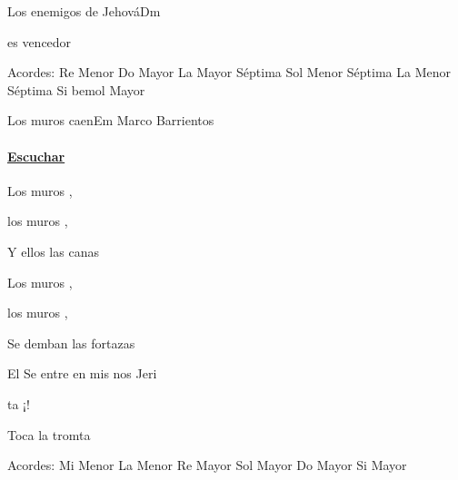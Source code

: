 \documentclass[12pt, spanish]{book}
\begin{document}
\begin{song}{Los enemigos de Jehová}{Dm}
\begin{SBOpGroup}
            es vencedor
        \end{SBOpGroup}

        \ifChordBk
        \begin{SBOpGroup}
            Acordes:\break
            \upchord{\Dm}\qquad Re Menor \hfill
            \upchord{\C}\qquad Do Mayor \hfill\null\break
            \upchord{\Aseven}\qquad La Mayor S\'eptima \hfill
            \upchord{\Gmseven}\qquad Sol Menor S\'eptima \hfill\null\break
            \upchord{\Amseven}\qquad La Menor S\'eptima \hfill
            \upchord{\Bflat}\qquad Si bemol Mayor \hfill\null\break
        \end{SBOpGroup}
        \fi
    \end{song}

    \begin{song}{Los muros caen}{Em}
    {} %
    {Marco Barrientos}
    {} %
    {}
        \ifChordBk
            \paragraph{\mbox{}\hfill\protect\href{https://open.spotify.com/intl-es/track/6Oa2fcRuhb9MMg7aONE8SX}{Escuchar}\mbox{}\hfill}
        \fi

        \begin{SBOpGroup}
            Los muros ,

            los muros ,

            Y  ellos las canas

            Los muros ,

            los muros ,

            Se demban las fortazas
        \end{SBOpGroup}

        \begin{SBChorus}
            El Se entre en mis nos Jeri

            ta ¡!

            Toca la tromta
        \end{SBChorus}

        \ifChordBk
        \begin{SBOpGroup}
            Acordes:
            \upchord{\Em}\qquad Mi Menor \hfill
            \upchord{\Am}\qquad La Menor \hfill\null\break
            \upchord{\D}\qquad Re Mayor \hfill
            \upchord{\G}\qquad Sol Mayor \hfill\null\break
            \upchord{\C}\qquad Do Mayor \hfill
            \upchord{\B}\qquad Si Mayor \hfill\null\break
        \end{SBOpGroup}
        \fi
    \end{song}
\end{document}
